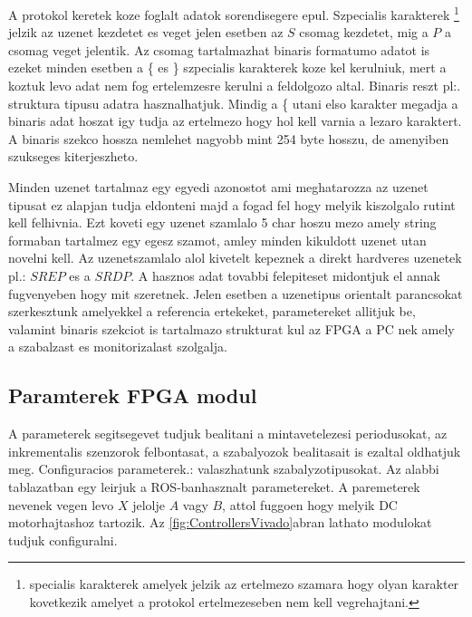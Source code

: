 \renewcommand{\img}{SajatRobot/FPGAmodulok/ProtokolDiagram.jpg}
\renewcommand{\sources}{*}
\renewcommand{\captionn}{FPGA komunikacios protokol altalanos csomag szerkezet}
\renewcommand{\figlabel}{FPGAComCsomagAlt}



A protokol keretek koze foglalt adatok sorendisegere epul. Szpecialis karakterek \footnote{specialis karakterek amelyek jelzik az ertelmezo szamara hogy olyan karakter kovetkezik amelyet a protokol ertelmezeseben nem kell vegrehajtani.} jelzik az uzenet kezdetet es veget jelen esetben az $S$ csomag kezdetet, mig a $P$ a csomag veget jelentik.
Az csomag tartalmazhat binaris formatumo adatot is ezeket minden esetben a \{ es \} szpecialis karakterek koze kel kerulniuk, mert a koztuk levo adat nem fog ertelemzesre kerulni a feldolgozo altal. Binaris reszt  pl:. struktura tipusu adatra hasznalhatjuk. Mindig a \{ utani elso karakter megadja a binaris adat hoszat igy tudja az ertelmezo hogy hol kell varnia a lezaro karaktert. A binaris szekco hossza nemlehet nagyobb mint 254 byte hosszu, de amenyiben szukseges kiterjeszheto.

Minden uzenet tartalmaz egy egyedi azonostot ami meghatarozza az uzenet tipusat ez alapjan tudja eldonteni majd a fogad fel hogy melyik kiszolgalo rutint kell felhivnia. Ezt koveti egy uzenet szamlalo 5 char hoszu mezo amely string formaban tartalmez egy egesz szamot, amley minden kikuldott uzenet utan novelni kell. Az uzenetszamlalo alol kivetelt kepeznek a direkt hardveres uzenetek pl.: $SREP$ es a $SRDP$.
A hasznos adat tovabbi felepiteset midontjuk el annak fugvenyeben hogy mit szeretnek. Jelen esetben a uzenetipus orientalt parancsokat szerkesztunk amelyekkel a referencia ertekeket, parametereket allitjuk be, valamint binaris szekciot is tartalmazo strukturat kul az FPGA a PC nek amely a szabalzast es monitorizalast szolgalja.

\subsection{Paramterek FPGA modul}

A parameterek segitsegevet tudjuk bealitani a mintavetelezesi periodusokat, az inkrementalis szenzorok felbontasat, a szabalyozok bealitasait is ezaltal oldhatjuk meg. Configuracios parameterek.: valaszhatunk szabalyzotipusokat.
Az alabbi tablazatban egy leirjuk a ROS-banhasznalt parametereket. A paremeterek nevenek vegen levo $X$ jelolje $A$ vagy $B$, attol fuggoen hogy melyik DC motorhajtashoz tartozik. Az \ref{fig:ControllersVivado}abran lathato modulokat tudjuk configuralni.

